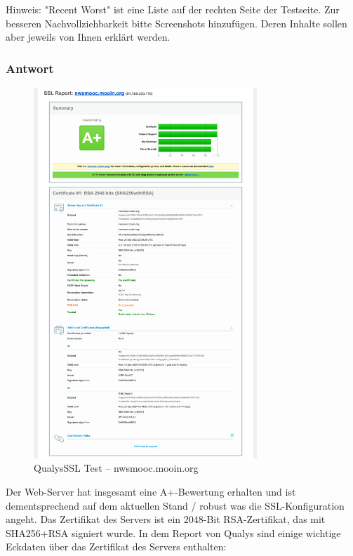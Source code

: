 \documentclass{article}
\begin{document}
Hinweis: "Recent Worst" ist eine Liste auf der rechten Seite der Testseite. Zur
besseren Nachvollziehbarkeit bitte Screenshots hinzufügen. Deren Inhalte sollen
aber jeweils von Ihnen erklärt werden.

\subsubsection*{Antwort}

\begin{figure}[H]
	\includegraphics[width=0.75\textwidth]{images/01}
	\centering
	\caption{QualysSSL Test – nwsmooc.mooin.org}
\end{figure}

Der Web-Server hat insgesamt eine A+-Bewertung erhalten und ist dementsprechend auf dem aktuellen Stand / robust was die SSL-Konfiguration angeht.
Das Zertifikat des Servers ist ein 2048-Bit RSA-Zertifikat, das mit SHA256+RSA signiert wurde.
In dem Report von Qualys sind einige wichtige Eckdaten über das Zertifikat des Servers enthalten:
\end{document}
